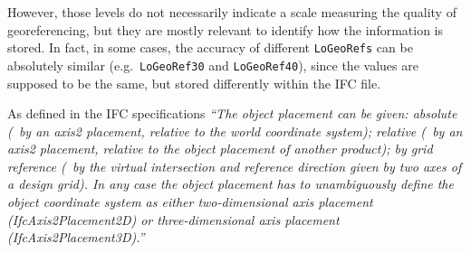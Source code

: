However, those levels do not necessarily indicate a scale measuring the quality of georeferencing, but they are mostly relevant to identify how the information is stored.
In fact, in some cases, the accuracy of different \texttt{LoGeoRefs} can be absolutely similar (e.g.\ \texttt{LoGeoRef30} and \texttt{LoGeoRef40}), since the values are supposed to be the same, but stored differently within the IFC file.

As defined in the IFC specifications \emph{``The object placement can be given:
	absolute (\ie\ by an axis2 placement, relative to the world coordinate system);
	relative (\ie\ by an axis2 placement, relative to the object placement of another product);
	by grid reference (\ie\ by the virtual intersection and reference direction given by two axes of a design grid).
	In any case the object placement has to unambiguously define the object coordinate system as either two-dimensional axis placement (IfcAxis2Placement2D) or three-dimensional axis placement (IfcAxis2Placement3D).''}

